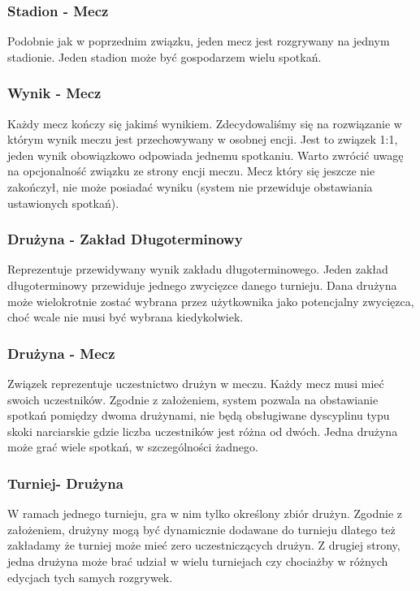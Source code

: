\documentclass{mwrep}[15pt]
\begin{document}
\subsubsection{Stadion - Mecz}
Podobnie jak w poprzednim związku, jeden mecz jest rozgrywany na jednym stadionie. Jeden stadion może być gospodarzem
wielu spotkań.

\subsubsection{Wynik - Mecz}
Każdy mecz kończy się jakimś wynikiem. Zdecydowaliśmy się na rozwiązanie w którym wynik meczu jest przechowywany w osobnej encji.
Jest to związek 1:1, jeden wynik obowiązkowo odpowiada jednemu spotkaniu. Warto zwrócić uwagę na opcjonalność związku ze strony encji meczu.
Mecz który się jeszcze nie zakończył, nie może posiadać wyniku (system nie przewiduje obstawiania ustawionych spotkań).

\subsubsection{Drużyna - Zakład Długoterminowy}
Reprezentuje przewidywany wynik zakładu długoterminowego. Jeden zakład długoterminowy przewiduje jednego zwycięzce danego turnieju. 
Dana drużyna może wielokrotnie zostać wybrana przez użytkownika jako potencjalny zwycięzca, choć wcale nie musi być wybrana kiedykolwiek.

\subsubsection{Drużyna - Mecz}
Związek reprezentuje uczestnictwo drużyn w meczu. Każdy mecz musi mieć swoich uczestników. Zgodnie z założeniem, system pozwala na 
obstawianie spotkań pomiędzy dwoma drużynami, nie będą obsługiwane dyscyplinu typu skoki narciarskie gdzie liczba uczestników jest różna od dwóch.
Jedna drużyna może grać wiele spotkań, w szczególności żadnego.


\subsubsection{Turniej- Drużyna }
W ramach jednego turnieju, gra w nim tylko określony zbiór drużyn. Zgodnie z założeniem, drużyny mogą być dynamicznie dodawane 
do turnieju dlatego też zakładamy że turniej może mieć zero uczestniczących drużyn. Z drugiej strony, jedna drużyna może brać udział 
w wielu turniejach czy chociażby w różnych edycjach tych samych rozgrywek.
\end{document}
